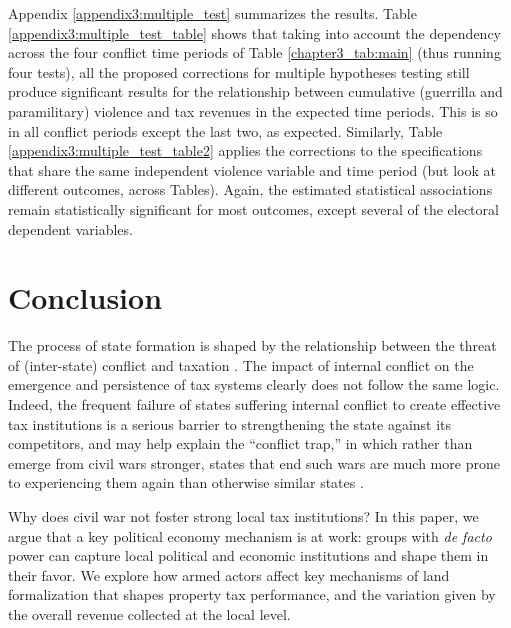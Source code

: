 Appendix \ref{appendix3:multiple_test} summarizes the results. Table \ref{appendix3:multiple_test_table} shows that taking into account the dependency across the four conflict time periods of Table \ref{chapter3_tab:main} (thus running four tests), all the proposed corrections for multiple hypotheses testing still produce significant results for the relationship between cumulative (guerrilla and paramilitary) violence and tax revenues in the expected time periods. This is so in all conflict periods except the last two, as expected. Similarly, Table \ref{appendix3:multiple_test_table2} applies the corrections to the specifications that share the same independent violence variable and time period (but look at different outcomes, across Tables). Again, the estimated statistical associations remain statistically significant for most outcomes, except several of the electoral dependent variables. 

\section{Conclusion}
The process of state formation is shaped by the relationship between the threat of (inter-state) conflict and taxation \citep{tilly92a}. The impact of internal conflict on the emergence and persistence of tax systems clearly does not follow the same logic. Indeed, the frequent failure of states suffering internal conflict to create effective tax institutions is a serious barrier to strengthening the state against its competitors, and may help explain the ``conflict trap,'' in which rather than emerge from civil wars stronger, states that end such wars are much more prone to experiencing them again than otherwise similar states \citep{collierelliott03a}.

Why does civil war not foster strong local tax institutions? In this paper, we argue that a key political economy mechanism is at work: groups with {\it de facto} power can capture local political and economic institutions and shape them in their favor. We explore how armed actors affect key mechanisms of land formalization that shapes property tax performance, and the variation given by the overall revenue collected at the local level. 

